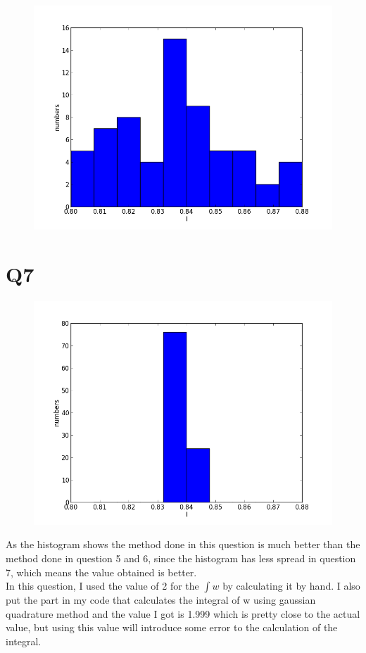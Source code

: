 \documentclass[letterpaper,12pt]{article}
\begin{document}
\FloatBarrier
\begin{figure}[H]
\centering
\includegraphics[scale=0.55]{q6.png}
\caption{}
\end{figure}
\FloatBarrier

\section*{Q7}

\FloatBarrier
\begin{figure}[H]
\centering
\includegraphics[scale=0.55]{q7.png}
\caption{}
\end{figure}
\FloatBarrier

As the histogram shows the method done in this question is much better than the method done in question 5 and 6, since the histogram has less spread in question 7, which means the value obtained is better.
\\In this question, I used the value of 2 for the $\int w$ by calculating it by hand. I also put the part in my code that calculates the integral of w using gaussian quadrature method and the value I got is 1.999 which is pretty close to the actual value, but using this value will introduce some error to the calculation of the integral.
\end{document}
